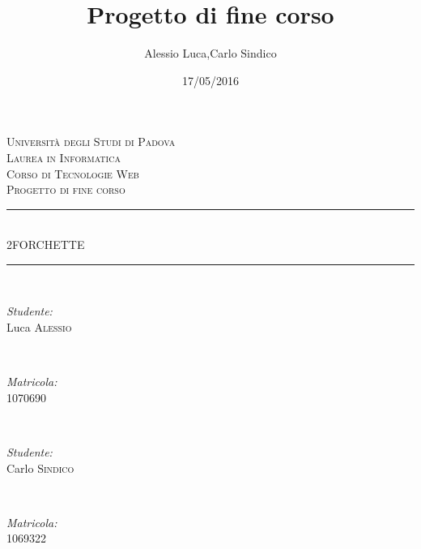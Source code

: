 \documentclass[12pt]{article}
\title{Progetto di fine corso}
\date{17/05/2016}
\author{Alessio Luca,Carlo Sindico}
\begin{document}
	
	\begin{titlepage}
		\newcommand{\HRule}{\rule{\linewidth}{0.5mm}}%
		\center
		
		\textsc{\LARGE Universit\`a degli Studi di Padova}\\[1.5cm] 
		\textsc{\Large Laurea in Informatica}\\[0.5cm]
		\textsc{\large Corso di Tecnologie Web}\\[0.5cm]
		\textsc{\large Progetto di fine corso}\\[0.5cm]
		
		
		\HRule \\[0.4cm]
		{ \huge  2FORCHETTE}\\[0.3cm] 
		\HRule \\[0.4cm]
		
		
		
		\begin{minipage}{0.3\textwidth}
			\begin{flushleft} \large
				\emph{Studente:}\\
				Luca \textsc{Alessio} %
			\end{flushleft}
		\end{minipage}
		~
		\begin{minipage}{0.3\textwidth}
			\begin{flushright} \large
				\emph{Matricola:} \\
				\textsc{1070690} %
			\end{flushright}
		\end{minipage}\\[1cm]
		
			\begin{minipage}{0.3\textwidth}
				\begin{flushleft} \large
					\emph{Studente:}\\
					Carlo \textsc{Sindico} %
				\end{flushleft}
			\end{minipage}
			~
			\begin{minipage}{0.3\textwidth}
				\begin{flushright} \large
					\emph{Matricola:} \\
					\textsc{1069322} %
				\end{flushright}
			\end{minipage}\\[1cm]
			

\end{titlepage}
\end{document}
